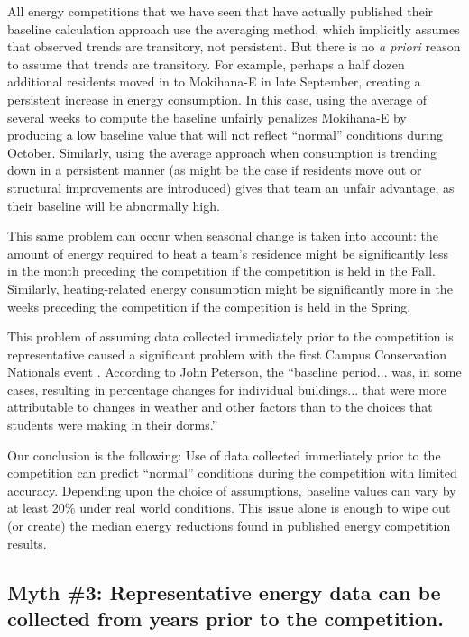 \documentclass[jou]{apa} %
\begin{document}
All energy competitions that we have seen that have actually published their baseline
calculation approach use the averaging method, which implicitly assumes that observed
trends are transitory, not persistent.  But there is no {\em a priori} reason to assume
that trends are transitory.  For example, perhaps a half dozen additional residents moved
in to Mokihana-E in late September, creating a persistent increase in energy consumption.
In this case, using the average of several weeks to compute the baseline unfairly
penalizes Mokihana-E by producing a low baseline value that will not reflect ``normal''
conditions during October.  Similarly, using the average approach when consumption is
trending down in a persistent manner (as might be the case if residents move out or
structural improvements are introduced) gives that team an unfair advantage, as their
baseline will be abnormally high.

This same problem can occur when seasonal change is taken into account: the amount of
energy required to heat a team's residence might be significantly less in the month
preceding the competition if the competition is held in the Fall. Similarly,
heating-related energy consumption might be significantly more in the weeks preceding the
competition if the competition is held in the Spring.  

This problem of assuming data collected immediately prior to the competition is
representative caused a significant problem with the first Campus Conservation
Nationals event \cite{Willens2010}.  According to John Peterson, the ``baseline
period... was, in some cases, resulting in percentage changes for individual
buildings... that were more attributable to changes in weather and other factors than to
the choices that students were making in their dorms.''

Our conclusion is the following: Use of data collected immediately prior to the
competition can predict ``normal'' conditions during the competition with limited
accuracy. Depending upon the choice of assumptions, baseline values can vary by at least
20\% under real world conditions.  This issue alone is enough to wipe out (or create) the median
energy reductions found in published energy competition results.

\subsection{Myth \#3: Representative energy data can be collected from years  prior to the competition.}
\end{document}
